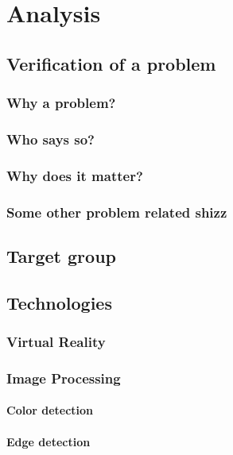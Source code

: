 \chapter{Analysis}
	
	
	\section{Verification of a problem}\label{sec:verification}
		\subsection{Why a problem?}
		
		\subsection{Who says so?}
		
		\subsection{Why does it matter?}
		
		\subsection{Some other problem related shizz}

	\section{Target group}\label{sec:targetGroup}

	\section{Technologies}\label{sec:technologies}
		\subsection{Virtual Reality}
		\subsection{Image Processing}
			\subsubsection{Color detection}
			\subsubsection{Edge detection}

